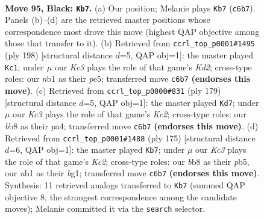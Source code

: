 \documentclass[11pt]{article}
\begin{document}
\clearpage

\begin{figure}[p]\centering
\begin{subfigure}{0.46\textwidth}\centering
\resizebox{\linewidth}{!}{%
\newchessgame
\chessboard[
  setfen={1B6/8/2k5/8/p1p3b1/8/5K2/1N6 b - - 45 95},
  showmover=false,
  pgfstyle=straightmove, color=movearrow, markmove={c6-b7}
]}
\caption{}
\end{subfigure}\hfill
\begin{subfigure}{0.46\textwidth}\centering
\resizebox{\linewidth}{!}{%
\newchessgame
\chessboard[
  setfen={4k3/8/8/4p3/8/5P2/B2K4/6b1 w - - 21 100},
  showmover=false,
  pgfstyle=straightmove, color=movearrow, markmove={d2-c1}
]}
\caption{}
\end{subfigure}
\\[4pt]
\begin{subfigure}{0.46\textwidth}\centering
\resizebox{\linewidth}{!}{%
\newchessgame
\chessboard[
  setfen={8/2k5/8/p2K4/P7/3N4/4p3/8 b - - 47 90},
  showmover=false,
  pgfstyle=straightmove, color=movearrow, markmove={c7-d7}
]}
\caption{}
\end{subfigure}\hfill
\begin{subfigure}{0.46\textwidth}\centering
\resizebox{\linewidth}{!}{%
\newchessgame
\chessboard[
  setfen={8/2k5/8/1P5b/5p2/8/8/4K1B1 b - - 15 88},
  showmover=false,
  pgfstyle=straightmove, color=movearrow, markmove={c7-b7}
]}
\caption{}
\end{subfigure}
\caption{\textbf{Move 95, Black: \texttt{Kb7}.} (a) Our position; Melanie plays \texttt{Kb7} (\texttt{c6b7}). Panels (b)--(d) are the retrieved master positions whose correspondence most drove this move (highest QAP objective among those that transfer to it). (b) Retrieved from \texttt{ccrl\_top\_p0001\#1495} (ply 198) [structural distance $d$=5, QAP obj=1]: the master played \texttt{Kc1}; under $\mu$ our \emph{Kc3} plays the role of that game's \emph{Kd2}; cross-type roles: our \emph{n}b1 as their \emph{p}e5; transferred move \texttt{c6b7} \textbf{(endorses this move)}. (c) Retrieved from \texttt{ccrl\_top\_p0000\#831} (ply 179) [structural distance $d$=5, QAP obj=1]: the master played \texttt{Kd7}; under $\mu$ our \emph{Kc3} plays the role of that game's \emph{Kc2}; cross-type roles: our \emph{b}b8 as their \emph{p}a4; transferred move \texttt{c6b7} \textbf{(endorses this move)}. (d) Retrieved from \texttt{ccrl\_top\_p0001\#1488} (ply 175) [structural distance $d$=6, QAP obj=1]: the master played \texttt{Kb7}; under $\mu$ our \emph{Kc3} plays the role of that game's \emph{Kc2}; cross-type roles: our \emph{b}b8 as their \emph{p}b5, our \emph{n}b1 as their \emph{b}g1; transferred move \texttt{c6b7} \textbf{(endorses this move)}. Synthesis: 11 retrieved analogs transferred to \texttt{Kb7} (summed QAP objective 8, the strongest correspondence among the candidate moves); Melanie committed it via the \texttt{search} selector.}
\label{fig:thought-m189}
\end{figure}
\end{document}
